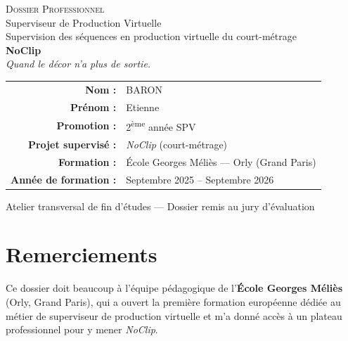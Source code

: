 \documentclass[11pt,a4paper]{report}
\begin{document}
\sloppy

\begin{titlepage}
\thispagestyle{empty}
\vspace*{2.4cm}
\begin{center}
{\color{braccent}\fontsize{15}{18}\selectfont \textsc{Dossier Professionnel}}\\[4pt]
{\color{brgris}\large Superviseur de Production Virtuelle}\\[3.4cm]

{\color{brdark}\large Supervision des séquences en production virtuelle du court-métrage}\\[12pt]
{\color{brdark}\fontsize{58}{60}\selectfont \textbf{NoClip}}\\[10pt]
{\color{brgris}\large \textit{Quand le décor n'a plus de sortie.}}\\[3.2cm]

\begin{tabular}{rl}
\textbf{\color{brdark}Nom :} & BARON \\[3pt]
\textbf{\color{brdark}Prénom :} & Etienne \\[3pt]
\textbf{\color{brdark}Promotion :} & 2\textsuperscript{ème} année SPV \\[3pt]
\textbf{\color{brdark}Projet supervisé :} & \textit{NoClip} (court-métrage) \\[3pt]
\textbf{\color{brdark}Formation :} & École Georges Méliès --- Orly (Grand Paris) \\[3pt]
\textbf{\color{brdark}Année de formation :} & Septembre 2025 -- Septembre 2026 \\
\end{tabular}

\vfill
{\color{brgris}\small Atelier transversal de fin d'études --- Dossier remis au jury d'évaluation}
\end{center}
\end{titlepage}

\cleardoublepage
{}

\chapter*{Remerciements}
Ce dossier doit beaucoup à l'équipe pédagogique de l'\textbf{École Georges Méliès} (Orly, Grand Paris), qui a ouvert la première formation européenne dédiée au métier de superviseur de production virtuelle et m'a donné accès à un plateau professionnel pour y mener \textit{NoClip}.
\end{document}
